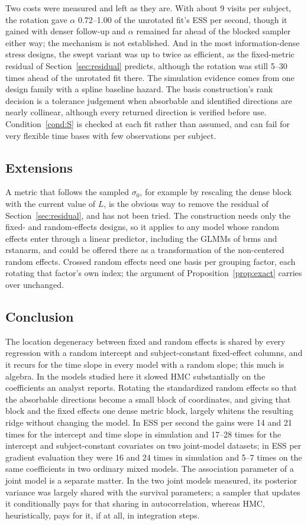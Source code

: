 Two costs were measured and left as they are. With about 9 visits per
subject, the rotation gave $\alpha$ 0.72--1.00 of the unrotated fit's ESS
per second, though it gained with denser follow-up and $\alpha$ remained
far ahead of the blocked sampler either way; the mechanism is not
established. And in the most information-dense stress designs, the swept
variant was up to twice as efficient, as the fixed-metric residual of
Section~\ref{sec:residual} predicts, although the rotation was still
5--30 times ahead of the unrotated fit there. The simulation evidence comes from one design family with a
spline baseline hazard. The basis construction's rank decision is a
tolerance judgement when absorbable and identified directions are nearly
collinear, although every returned direction is verified before use.
Condition~\ref{cond:S} is checked at each fit rather than assumed, and can
fail for very flexible time bases with few observations per subject.

\subsection{Extensions}

A metric that follows the sampled $\sigma_0$, for example by rescaling the
dense block with the current value of $L$, is the obvious way to remove
the residual of Section~\ref{sec:residual}, and has not been tried. The
construction needs only the fixed- and random-effects designs, so it
applies to any model whose random effects enter through a linear
predictor, including the GLMMs of brms and rstanarm, and could be offered
there as a transformation of the non-centered random effects. Crossed
random effects need one basis per grouping factor, each rotating that
factor's own index; the argument of Proposition~\ref{prop:exact} carries
over unchanged.

\subsection{Conclusion}

The location degeneracy between fixed and random effects is shared by every regression with a random intercept and subject-constant fixed-effect columns, and it
recurs for the time slope in every model with a random slope; this much
is algebra. In the models studied here it slowed HMC substantially on the
coefficients an analyst reports. Rotating the standardized random effects
so that the absorbable directions become a small block of coordinates, and
giving that block and the fixed effects one dense metric block, largely whitens the resulting ridge without changing the model. In ESS per second the
gains were 14 and 21 times for the intercept and time slope in
simulation and 17--28 times for the intercept and subject-constant
covariates on two joint-model datasets; in ESS per gradient evaluation
they were 16 and 24 times in simulation and 5--7 times on the same
coefficients in two ordinary mixed models. The association parameter of a
joint model is a separate matter. In the two joint models measured, its posterior variance was largely shared with the survival parameters; a sampler that updates it conditionally pays for that sharing in autocorrelation, whereas HMC, heuristically, pays for it, if at all, in integration steps.
